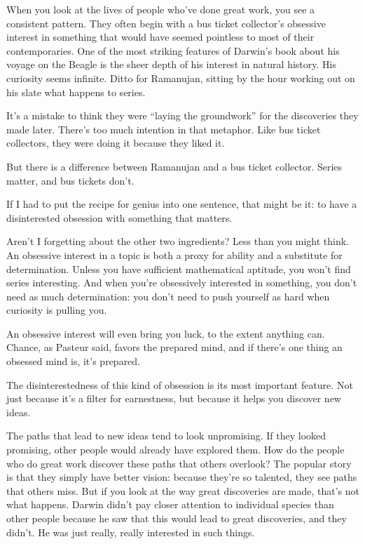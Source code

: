 \documentclass[12pt]{book}
\begin{document}
When you look at the lives of people who've done great work, you see a
consistent pattern. They often begin with a bus ticket collector's
obsessive interest in something that would have seemed pointless to most
of their contemporaries. One of the most striking features of Darwin's
book about his voyage on the Beagle is the sheer depth of his interest
in natural history. His curiosity seems infinite. Ditto for Ramanujan,
sitting by the hour working out on his slate what happens to series.

It's a mistake to think they were ``laying the groundwork'' for the
discoveries they made later. There's too much intention in that
metaphor. Like bus ticket collectors, they were doing it because they
liked it.

But there is a difference between Ramanujan and a bus ticket collector.
Series matter, and bus tickets don't.

If I had to put the recipe for genius into one sentence, that might be
it: to have a disinterested obsession with something that matters.

Aren't I forgetting about the other two ingredients? Less than you might
think. An obsessive interest in a topic is both a proxy for ability and
a substitute for determination. Unless you have sufficient mathematical
aptitude, you won't find series interesting. And when you're obsessively
interested in something, you don't need as much determination: you don't
need to push yourself as hard when curiosity is pulling you.

An obsessive interest will even bring you luck, to the extent anything
can. Chance, as Pasteur said, favors the prepared mind, and if there's
one thing an obsessed mind is, it's prepared.

The disinterestedness of this kind of obsession is its most important
feature. Not just because it's a filter for earnestness, but because it
helps you discover new ideas.

The paths that lead to new ideas tend to look unpromising. If they
looked promising, other people would already have explored them. How do
the people who do great work discover these paths that others overlook?
The popular story is that they simply have better vision: because
they're so talented, they see paths that others miss. But if you look at
the way great discoveries are made, that's not what happens. Darwin
didn't pay closer attention to individual species than other people
because he saw that this would lead to great discoveries, and they
didn't. He was just really, really interested in such things.
\end{document}
